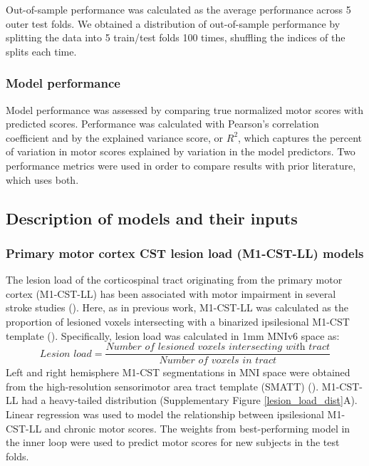 \documentclass[10pt]{article}
\begin{document}
Out-of-sample performance was calculated as the average performance across 5 outer test folds. We obtained a distribution of out-of-sample performance by splitting the data into 5 train/test folds 100 times, shuffling the indices of the splits each time. 

\subsubsection*{Model performance}
Model performance was assessed by comparing true normalized motor scores with predicted scores. Performance was calculated with Pearson's correlation coefficient and by the explained variance score, or $R^2$, which captures the percent of variation in motor scores explained by variation in the model predictors. Two performance metrics were used in order to compare results with prior literature, which uses both.

\subsection{Description of models and their inputs}
\subsubsection*{Primary motor cortex CST lesion load (M1-CST-LL) models}

The lesion load of the corticospinal tract originating from the primary motor cortex (M1-CST-LL) has been associated with motor impairment in several stroke studies (\cite{Stinear2017-eg}). Here, as in previous work, M1-CST-LL was calculated as the proportion of lesioned voxels intersecting with a binarized ipsilesional M1-CST template (\cite{Zhu2010-qh}). Specifically, lesion load was calculated in 1mm MNIv6 space as:
\begin{equation}
    \textit{Lesion load} = \frac{\textit{Number of lesioned voxels intersecting with  tract}}{\textit{Number of voxels in tract}}
\end{equation}
Left and right hemisphere M1-CST segmentations in MNI space were obtained from the high-resolution sensorimotor area tract template (SMATT) (\cite{Archer2018-ti}). M1-CST-LL had a heavy-tailed distribution (Supplementary Figure \ref{lesion_load_dist}A).
Linear regression was used to model the relationship between ipsilesional M1-CST-LL and chronic motor scores. The weights from best-performing model in the inner loop were used to predict motor scores for new subjects in the test folds. 
\end{document}
